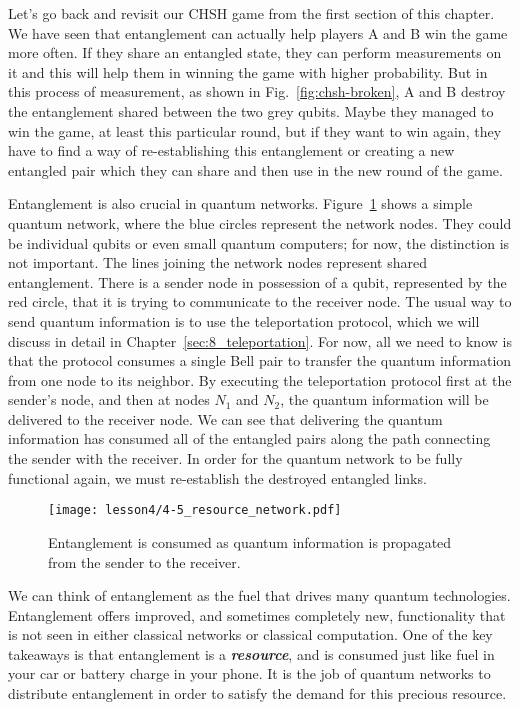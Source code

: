 
Let's go back and revisit our CHSH game from the first section of this chapter. We have seen that entanglement can actually help players A and B win the game more often. If they share an entangled state, they can perform measurements on it and this will help them in winning the game with higher probability. But in this process of measurement, as shown in Fig.~\ref{fig:chsh-broken}, A and B destroy the entanglement shared between the two grey qubits.  Maybe they managed to win the game, at least this particular round, but if they want to win again, they have to find a way of re-establishing this entanglement or creating a new entangled pair which they can share and then use in the new round of the game. 

Entanglement is also crucial in quantum networks.
Figure~\ref{fig:4-5_resource_network} shows a simple quantum network, where the blue circles represent the network nodes.
They could be individual qubits or even small quantum computers; for now, the distinction is not important.
The lines joining the network nodes represent shared entanglement.
There is a sender node in possession of a qubit, represented by the red circle, that it is trying to communicate to the receiver node.
The usual way to send quantum information is to use the teleportation protocol, which we will discuss in detail in Chapter~\ref{sec:8_teleportation}.
For now, all we need to know is that the protocol consumes a single Bell pair to transfer the quantum information from one node to its neighbor.
By executing the teleportation protocol first at the sender's node, and then at nodes $N_1$ and $N_2$, the quantum information will be delivered to the receiver node.
We can see that delivering the quantum information has consumed all of the entangled pairs along the path connecting the sender with the receiver.
In order for the quantum network to be fully functional again, we must re-establish the destroyed entangled links.

\begin{figure}[t]
    \centering
    \texttt{[image: lesson4/4-5\_resource\_network.pdf]}
    \caption[Consumption of entanglement in a quantum network.]{Entanglement is consumed as quantum information is propagated from the sender to the receiver.}
    \label{fig:4-5_resource_network}
\end{figure}

We can think of entanglement as the fuel that drives many quantum technologies. Entanglement offers improved, and sometimes completely new, functionality that is not seen in either classical networks or classical computation.
One of the key takeaways is that entanglement is a \textbf{\textit{resource}}, and is consumed just like fuel in your car or battery charge in your phone.
It is the job of quantum networks to distribute entanglement in order to satisfy the demand for this precious resource.


